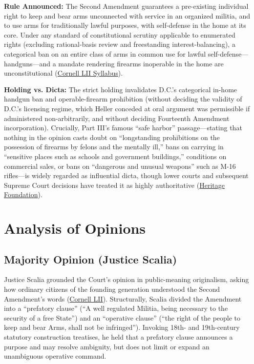 \documentclass[12pt]{article}
\begin{document}
\textbf{Rule Announced:} The Second Amendment guarantees a pre-existing individual right to keep and bear arms unconnected with service in an organized militia, and to use arms for traditionally lawful purposes, with self-defense in the home at its core. Under any standard of constitutional scrutiny applicable to enumerated rights (excluding rational-basis review and freestanding interest-balancing), a categorical ban on an entire class of arms in common use for lawful self-defense---handguns---and a mandate rendering firearms inoperable in the home are unconstitutional (\href{https://www.law.cornell.edu/supct/html/07-290.ZS.html}{Cornell LII Syllabus}).

\textbf{Holding vs. Dicta:} The strict holding invalidates D.C.'s categorical in-home handgun ban and operable-firearm prohibition (without deciding the validity of D.C.'s licensing regime, which Heller conceded at oral argument was permissible if administered non-arbitrarily, and without deciding Fourteenth Amendment incorporation). Crucially, Part III's famous ``safe harbor'' passage---stating that nothing in the opinion casts doubt on ``longstanding prohibitions on the possession of firearms by felons and the mentally ill,'' bans on carrying in ``sensitive places such as schools and government buildings,'' conditions on commercial sales, or bans on ``dangerous and unusual weapons'' such as M-16 rifles---is widely regarded as influential dicta, though lower courts and subsequent Supreme Court decisions have treated it as highly authoritative (\href{https://www.heritage.org/courts/report/long-standing-and-presumptively-lawful-hellers-dicta-vs-history-and-dicta}{Heritage Foundation}).

\section{Analysis of Opinions}

\subsection{Majority Opinion (Justice Scalia)}
Justice Scalia grounded the Court's opinion in public-meaning originalism, asking how ordinary citizens of the founding generation understood the Second Amendment's words (\href{https://www.law.cornell.edu/supct/html/07-290.ZO.html}{Cornell LII}). Structurally, Scalia divided the Amendment into a ``prefatory clause'' (``A well regulated Militia, being necessary to the security of a free State'') and an ``operative clause'' (``the right of the people to keep and bear Arms, shall not be infringed''). Invoking 18th- and 19th-century statutory construction treatises, he held that a prefatory clause announces a purpose and may resolve ambiguity, but does not limit or expand an unambiguous operative command.
\end{document}
